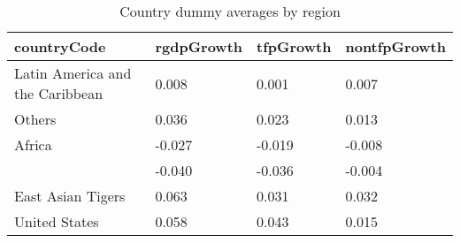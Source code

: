 \begin{table}[ht]
\centering
\begin{tabular}{llll}
  \hline
countryCode & rgdpGrowth & tfpGrowth & nontfpGrowth \\ 
  \hline
Latin America and the Caribbean & 0.008 & 0.001 & 0.007 \\ 
  Others & 0.036 & 0.023 & 0.013 \\ 
  Africa & -0.027 & -0.019 & -0.008 \\ 
   & -0.040 & -0.036 & -0.004 \\ 
  East Asian Tigers & 0.063 & 0.031 & 0.032 \\ 
  United States & 0.058 & 0.043 & 0.015 \\ 
   \hline
\end{tabular}
\caption{Country dummy averages by region} 
\end{table}
